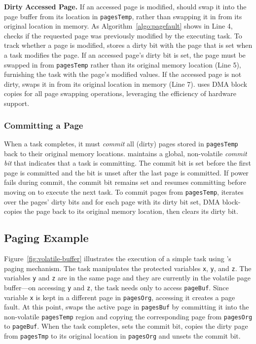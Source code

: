 \textbf{Dirty Accessed Page.} If an accessed page is modified, \sys should swap it into the page buffer from its location in {\tt pagesTemp}, rather than swapping it in from its original location in memory. As Algorithm~\ref{algo:pagefault} shows in Line 4, \sys checks if the requested page was previously modified by the executing task. To track whether a page is modified, \sys stores a dirty bit with the page that is set when a task modifies the page. If an accessed page's dirty bit is set, the page must be swapped in from \texttt{pagesTemp} rather than its original memory location (Line 5), furnishing the task with the page's modified values. If the accessed page is not dirty, \sys swaps it in from its original location in memory (Line 7). \sys uses DMA block copies for all page swapping operations, leveraging the efficiency of hardware support.

\subsubsection{Committing a Page}

When a task completes, it must {\em commit} all (dirty) pages stored in \texttt{pagesTemp} back to their original memory locations. \sys maintains a global, non-volatile {\em commit bit} that indicates that a task is committing. The commit bit is set before the first page is committed and the bit is unset after the last page is committed. If power fails during commit, the commit bit remains set and \sys resumes committing before moving on to execute the next task. To commit pages from {\tt pagesTemp}, \sys iterates over the pages' dirty bits and for each page with its dirty bit set, \sys DMA block-copies the page back to its
original memory location, then clears its dirty bit.

\subsection{Paging Example}

Figure~\ref{fig:volatile-buffer} illustrates the execution of a simple task using \sys's paging mechanism. The task manipulates the protected variables {\tt x}, {\tt y}, and {\tt z}. The variables {\tt y} and {\tt z} are in the same page and they are currently in the volatile page buffer---on accessing {\tt y} and {\tt z}, the task needs only to access \texttt{pageBuf}. Since variable \texttt{x} is kept in a different page in \texttt{pagesOrg}, accessing it creates a page fault. At this point, \sys swaps the active page in \texttt{pagesBuf} by committing it into the non-volatile {\tt pagesTemp} region and copying the corresponding page from \texttt{pagesOrg} to \texttt{pageBuf}. When the task completes, \sys sets the commit bit, copies the dirty page from \texttt{pagesTmp} to its original location in \texttt{pagesOrg} and unsets the commit bit.

